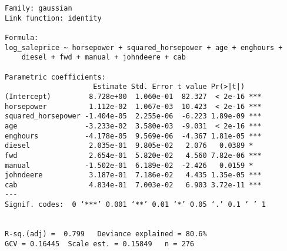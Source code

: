 \begin{verbatim}
Family: gaussian 
Link function: identity 

Formula:
log_saleprice ~ horsepower + squared_horsepower + age + enghours + 
    diesel + fwd + manual + johndeere + cab

Parametric coefficients:
                     Estimate Std. Error t value Pr(>|t|)    
(Intercept)         8.728e+00  1.060e-01  82.327  < 2e-16 ***
horsepower          1.112e-02  1.067e-03  10.423  < 2e-16 ***
squared_horsepower -1.404e-05  2.255e-06  -6.223 1.89e-09 ***
age                -3.233e-02  3.580e-03  -9.031  < 2e-16 ***
enghours           -4.178e-05  9.569e-06  -4.367 1.81e-05 ***
diesel              2.035e-01  9.805e-02   2.076   0.0389 *  
fwd                 2.654e-01  5.820e-02   4.560 7.82e-06 ***
manual             -1.502e-01  6.189e-02  -2.426   0.0159 *  
johndeere           3.187e-01  7.186e-02   4.435 1.35e-05 ***
cab                 4.834e-01  7.003e-02   6.903 3.72e-11 ***
---
Signif. codes:  0 ‘***’ 0.001 ‘**’ 0.01 ‘*’ 0.05 ‘.’ 0.1 ‘ ’ 1


R-sq.(adj) =  0.799   Deviance explained = 80.6%
GCV = 0.16445  Scale est. = 0.15849   n = 276
\end{verbatim}